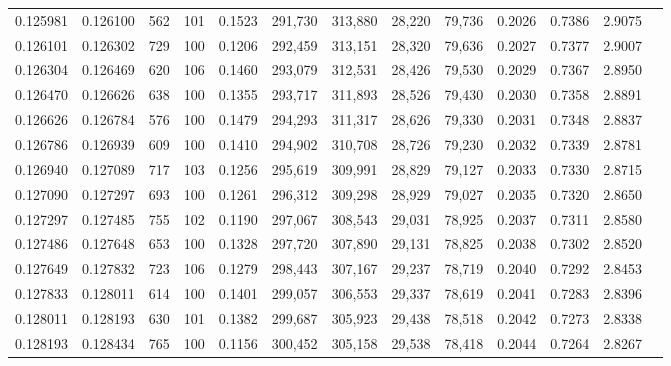 \begin{tabular}{rrrrrrrrrrrrr}
0.125981 & 0.126100 &   562 & 101 &                                     0.1523 & 291,730 & 313,880 &  28,220 &  79,736 & 0.2026 & 0.7386 & 2.9075 \\
0.126101 & 0.126302 &   729 & 100 &                                     0.1206 & 292,459 & 313,151 &  28,320 &  79,636 & 0.2027 & 0.7377 & 2.9007 \\
0.126304 & 0.126469 &   620 & 106 &                                     0.1460 & 293,079 & 312,531 &  28,426 &  79,530 & 0.2029 & 0.7367 & 2.8950 \\
0.126470 & 0.126626 &   638 & 100 &                                     0.1355 & 293,717 & 311,893 &  28,526 &  79,430 & 0.2030 & 0.7358 & 2.8891 \\
0.126626 & 0.126784 &   576 & 100 &                                     0.1479 & 294,293 & 311,317 &  28,626 &  79,330 & 0.2031 & 0.7348 & 2.8837 \\
0.126786 & 0.126939 &   609 & 100 &                                     0.1410 & 294,902 & 310,708 &  28,726 &  79,230 & 0.2032 & 0.7339 & 2.8781 \\
0.126940 & 0.127089 &   717 & 103 &                                     0.1256 & 295,619 & 309,991 &  28,829 &  79,127 & 0.2033 & 0.7330 & 2.8715 \\
0.127090 & 0.127297 &   693 & 100 &                                     0.1261 & 296,312 & 309,298 &  28,929 &  79,027 & 0.2035 & 0.7320 & 2.8650 \\
0.127297 & 0.127485 &   755 & 102 &                                     0.1190 & 297,067 & 308,543 &  29,031 &  78,925 & 0.2037 & 0.7311 & 2.8580 \\
0.127486 & 0.127648 &   653 & 100 &                                     0.1328 & 297,720 & 307,890 &  29,131 &  78,825 & 0.2038 & 0.7302 & 2.8520 \\
0.127649 & 0.127832 &   723 & 106 &                                     0.1279 & 298,443 & 307,167 &  29,237 &  78,719 & 0.2040 & 0.7292 & 2.8453 \\
0.127833 & 0.128011 &   614 & 100 &                                     0.1401 & 299,057 & 306,553 &  29,337 &  78,619 & 0.2041 & 0.7283 & 2.8396 \\
0.128011 & 0.128193 &   630 & 101 &                                     0.1382 & 299,687 & 305,923 &  29,438 &  78,518 & 0.2042 & 0.7273 & 2.8338 \\
0.128193 & 0.128434 &   765 & 100 &                                     0.1156 & 300,452 & 305,158 &  29,538 &  78,418 & 0.2044 & 0.7264 & 2.8267 \\

\end{tabular}
